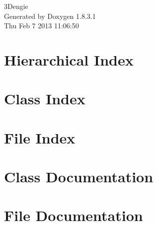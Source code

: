 \documentclass{book}
\begin{document}
\hypersetup{pageanchor=false,citecolor=blue}
\begin{titlepage}
\vspace*{7cm}
\begin{center}
{\Large 3\-Dengie }\\
\vspace*{1cm}
{\large Generated by Doxygen 1.8.3.1}\\
\vspace*{0.5cm}
{\small Thu Feb 7 2013 11:06:50}\\
\end{center}
\end{titlepage}
\clearemptydoublepage
{}
\tableofcontents
\clearemptydoublepage
{}
\hypersetup{pageanchor=true,citecolor=blue}
\chapter{Hierarchical Index}

\chapter{Class Index}

\chapter{File Index}

\chapter{Class Documentation}






















\chapter{File Documentation}










































\printindex
\end{document}
